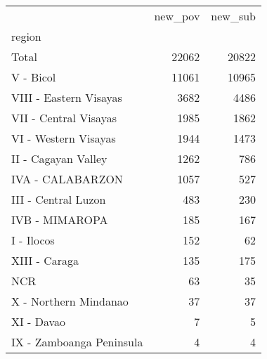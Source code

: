 \begin{tabular}{lrr}
\toprule
{} &  new\_pov &  new\_sub \\
region                   &          &          \\
\midrule
Total                    &    22062 &    20822 \\
V - Bicol                &    11061 &    10965 \\
VIII - Eastern Visayas   &     3682 &     4486 \\
VII - Central Visayas    &     1985 &     1862 \\
VI - Western Visayas     &     1944 &     1473 \\
II - Cagayan Valley      &     1262 &      786 \\
IVA - CALABARZON         &     1057 &      527 \\
III - Central Luzon      &      483 &      230 \\
IVB - MIMAROPA           &      185 &      167 \\
I - Ilocos               &      152 &       62 \\
XIII - Caraga            &      135 &      175 \\
NCR                      &       63 &       35 \\
X - Northern Mindanao    &       37 &       37 \\
XI - Davao               &        7 &        5 \\
IX - Zamboanga Peninsula &        4 &        4 \\
\bottomrule
\end{tabular}
